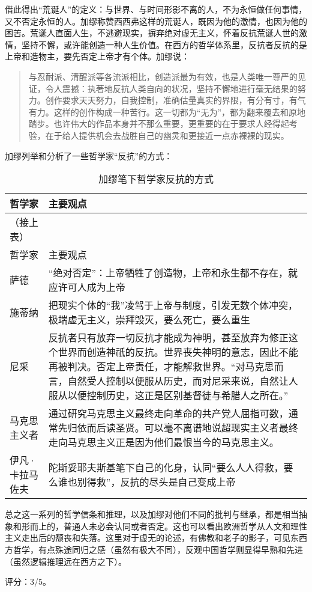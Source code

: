 借此得出“荒诞人”的定义：与世界、与时间形影不离的人，不为永恒做任何事情，又不否定永恒的人。加缪称赞西西弗这样的荒诞人，既因为他的激情，也因为他的困苦。荒诞人直面人生，不逃避现实，摒弃绝对虚无主义，怀着反抗荒诞人世的激情，坚持不懈，或许能创造一种人生价值。在西方的哲学体系里，反抗者反抗的是上帝和造物主，要先否定上帝才有个体。加缪说：
\begin{quotation}
与忍耐派、清醒派等各流派相比，创造派最为有效，也是人类唯一尊严的见证，令人震撼：执著地反抗人类自向的状况，坚持不懈地进行毫无结果的努力。创作要求天天努力，自我控制，准确估量真实的界限，有分有寸，有气有力。这样的创作构成一种苦行。这一切都为“无为”，都为翻来覆去和原地踏步。也许伟大的作品本身并不那么重要，更重要的在于要求人经得起考验，在于给人提供机会去战胜自己的幽灵和更接近一点赤裸裸的现实。
\end{quotation}

加缪列举和分析了一些哲学家“反抗”的方式：
\begin{longtable}{p{} | p{}}

    \caption{加缪笔下哲学家反抗的方式} \\
    \hline
哲学家 & 主要观点 \\
\hline
\endfirsthead

（接上表） \\
哲学家 & 主要观点 \\
\hline
\endhead

\hline
\endfoot
萨德 &  “绝对否定”：上帝牺牲了创造物，上帝和永生都不存在，就应许可人成为上帝 \\
施蒂纳 &  把现实个体的“我”凌驾于上帝与制度，引发无数个体冲突，极端虚无主义，崇拜毁灭，要么死亡，要么重生 \\
尼采 &  反抗者只有放弃一切反抗才能成为神明，甚至放弃为修正这个世界而创造神祇的反抗。世界丧失神明的意志，因此不能再被判决。否定上帝责任，才能解救世界。“对马克思而言，自然受人控制以便服从历史，而对尼采来说，自然让人服从以便控制历史，这正是区别基督徒与希腊人之所在。” \\
马克思主义者 &  通过研究马克思主义最终走向革命的共产党人屈指可数，通常先归依而后读圣贤。可以毫不离谱地说超现实主义者最终走向马克思主义正是因为他们最恨当今的马克思主义。 \\
伊凡·卡拉马佐夫 &  陀斯妥耶夫斯基笔下自己的化身，认同“要么人人得救，要么谁也别得救”，反抗的尽头是自己变成上帝 \\
\end{longtable}

总之这一系列的哲学信条和推理，以及加缪对他们不同的批判与继承，都是相当抽象和形而上的，普通人未必会认同或者否定。这也可以看出欧洲哲学从人文和理性主义走出后的颓丧和失落。这里对于虚无的论述，有佛教和老子的影子，可见东西方哲学，有点殊途同归之感（虽然有极大不同），反观中国哲学则显得早熟和先进（虽然逻辑推理远在西方之下）。

评分：3/5。
